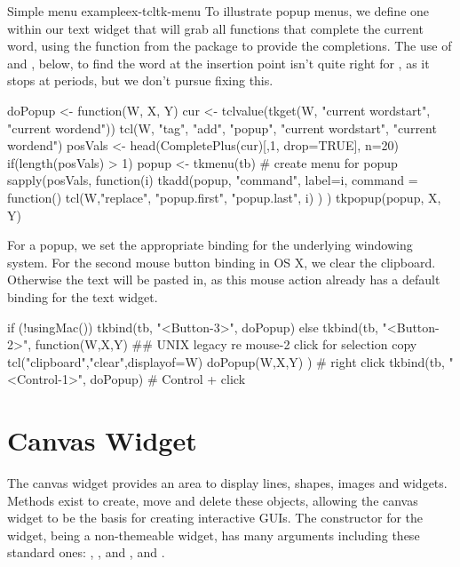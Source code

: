 \begin{example}{Simple menu example}{ex-tcltk-menu}
To illustrate popup menus, we define one within our text widget that
will grab all functions that complete the current word, using the
 function from the  package to
provide the completions.  The use of  and
, below, to find the word at the insertion point
isn't quite right for \R, as it stops at periods, but we don't pursue
fixing this.
\begin{Schunk}
\begin{Sinput}
 doPopup <- function(W, X, Y) {
   cur <- tclvalue(tkget(W, "current  wordstart", 
                            "current wordend"))
   tcl(W, "tag", "add", "popup", "current  wordstart", 
                                 "current wordend")
   posVals <- head(CompletePlus(cur)[,1, drop=TRUE], n=20)
   if(length(posVals) > 1) {
     popup <- tkmenu(tb)                # create menu for popup
     sapply(posVals, function(i) {         
       tkadd(popup, "command", label=i, command = function() {
         tcl(W,"replace", "popup.first", "popup.last", i)
       })
     })
     tkpopup(popup, X, Y)
  }}
\end{Sinput}
\end{Schunk}

For a popup, we set the appropriate binding for the underlying
windowing system. For the second mouse button binding in OS X, we
clear the clipboard. Otherwise the text  will be pasted in, as this mouse
action already has a default binding for the text widget.

\begin{Schunk}
\begin{Sinput}
 if (!usingMac()) {
   tkbind(tb, "<Button-3>", doPopup)
 } else {
   tkbind(tb, "<Button-2>", function(W,X,Y) {
     ## UNIX legacy re mouse-2 click for selection copy
     tcl("clipboard","clear",displayof=W) 
     doPopup(W,X,Y)
     })      # right click
   tkbind(tb, "<Control-1>", doPopup)     # Control + click
 }
\end{Sinput}
\end{Schunk}
\end{example}

\section{Canvas Widget}
\label{sec:tcltk:canvas-widget}

 
The canvas widget provides an area to display lines, shapes, images
and widgets. Methods exist to create, move and delete these objects,
allowing the canvas widget to be the basis for creating interactive
GUIs. The constructor  for the widget, being a
non-themeable widget, has many arguments including these standard ones:
, , and
, 
and .


